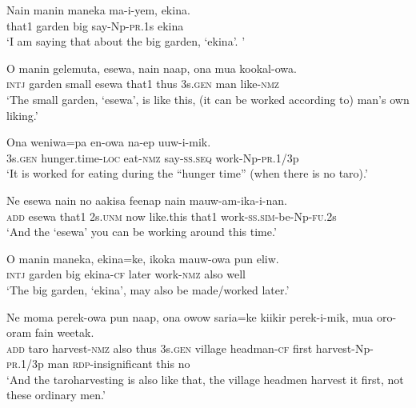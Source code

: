 \ea\label{ex:a:x28}
\gll  Nain  manin  maneka  ma-i-yem,  ekina. \\
that1  garden  big  say-Np-\textsc{pr}.1s  ekina \\
\glt ‘I am saying that about the big garden, ‘ekina’. ’ \\
\z


\ea\label{ex:a:x29}
\gll  O  manin  gelemuta,  esewa,  nain  naap,  ona  mua  kookal-owa. \\
\textsc{intj}  garden  small  esewa  that1  thus  3s.\textsc{gen}  man  like-\textsc{nmz} \\
\glt ‘The small garden, ‘esewa’, is like this, (it can be worked according to) man’s own liking.’ \\
\z


\ea\label{ex:a:x30}
\gll  Ona  weniwa=pa  en-owa  na-ep  uuw-i-mik. \\
3s.\textsc{gen}  hunger.time-\textsc{loc}  eat-\textsc{nmz}  say-\textsc{ss.seq}  work-Np-\textsc{pr}.1/3p \\
\glt ‘It is worked for eating during the “hunger time” (when there is no taro).’ \\
\z


\ea\label{ex:a:x31}
\gll  Ne  esewa  nain  no  aakisa  feenap  nain  mauw-am-ika-i-nan. \\
\textsc{add}  esewa  that1  2s.\textsc{unm}  now  like.this  that1  work-\textsc{ss}.\textsc{sim}-be-Np-\textsc{fu}.2s \\
\glt ‘And the ‘esewa’ you can be working around this time.’ \\
\z


\ea\label{ex:a:x32}
\gll  O  manin  maneka,  ekina=ke,  ikoka  mauw-owa  pun  eliw. \\
\textsc{intj}  garden  big  ekina-\textsc{cf}  later  work-\textsc{nmz}  also  well \\
\glt ‘The big garden, ‘ekina’, may also be made/worked later.’ \\
\z


\ea\label{ex:a:x33}
\gll  Ne  moma  perek-owa  pun  naap,  ona  owow  saria=ke  kiikir       perek-i-mik,  mua  oro-oram  fain  weetak. \\
\textsc{add}  taro  harvest-\textsc{nmz}  also  thus  3s.\textsc{gen}  village  headman-\textsc{cf}  first   harvest-Np-\textsc{pr}.1/3p  man  \textsc{rdp}-insignificant  this  no \\


\glt ‘And the taroharvesting is also like that, the village headmen harvest it first, not these ordinary men.’ \\
\z


